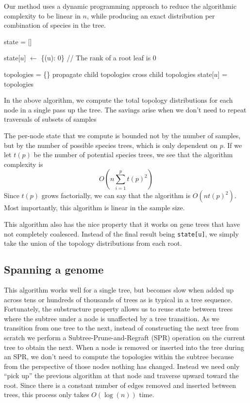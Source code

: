 \documentclass{article}
\begin{document}
Our method uses a dynamic programming approach to reduce the algorithmic
complexity to be linear in $n$, while producing an exact distribution per
combination of species in the tree.
\begin{algorithmic}
    \State state = []

        \State state[$u$] $\leftarrow$ \{(u): 0\} // The rank of a root leaf is 0
    \EndProcedure

        \State topologies = \{\}
        \State propagate child topologies  %
        \State cross child topologies  %
        \State state[$u$] = topologies
    \EndProcedure

        \State {}
    \EndFor

        \State {}
    \EndFor
\end{algorithmic}
In the above algorithm, we compute the total topology distributions for each node
in a single pass up the tree. The savings arise when we don't need to repeat
traversals of subsets of samples 

The per-node state that we compute is bounded not by the
number of samples, but by the number of possible species trees, which is only dependent
on $p$. If we let $t(p)$ be the number of potential species trees, we see that
the algorithm complexity is
\[
    O(n \sum_{i=1}^p t(p)^2)
\]
Since $t(p)$ grows factorially, we can say that the algorithm is 
$O(n t(p)^2)$. Most importantly, this algorithm is linear in the sample size.

This algorithm also has the nice property that it works on gene trees
that have not completely coalesced. Instead of the final result being
\texttt{state[u]}, we simply take the union of the topology distributions
from each root.

\subsection{Spanning a genome}
This algorithm works well for a single tree, but becomes slow when added up
across tens or hundreds of thousands of trees as is typical in a tree sequence.
Fortunately, the substructure property allows us to reuse state between trees
where the subtree under a node is unaffected by a tree transition.
As we transition from one tree to the next, instead of constructing
the next tree from scratch we perform a Subtree-Prune-and-Regraft (SPR) operation
on the current tree to obtain the next.
When a node is removed or inserted into the tree during an SPR, we don't
need to compute the topologies within the subtree because from the perspective
of those nodes nothing has changed.
Instead we need only ``pick up'' the previous algorithm at that node and traverse
upward toward the root.
Since there is a constant number of edges removed and inserted between trees,
this process only takes $O(\log(n))$ time.
\end{document}
